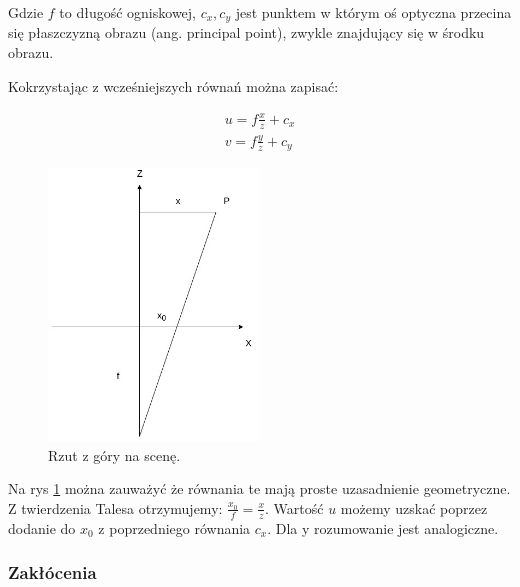 \documentclass{article}
\begin{document}
Gdzie $f$ to długość ogniskowej, $c_x, c_y$ jest punktem w którym oś optyczna przecina się płaszczyzną obrazu (ang. principal point), zwykle znajdujący się w środku obrazu.

Kokrzystając z wcześniejszych równań można zapisać:

\begin{align*}
	u = f \frac{x}{z} + c_x \\
	v = f \frac{y}{z} + c_y
\end{align*}

\begin{figure}
\centering
	\includegraphics[width=0.50\textwidth]{rzutowanie.jpg}\par\vspace{1cm}
\caption{Rzut z góry na scenę.}
	\label{fig:projection_up}
\end{figure}

Na rys \ref{fig:projection_up} można zauważyć że równania te mają proste uzasadnienie geometryczne. Z twierdzenia Talesa otrzymujemy: 
$\frac{x_0}{f} = \frac{x}{z}$. Wartość $u$ możemy uzskać poprzez dodanie do $x_0$ z poprzedniego równania $c_x$. Dla y rozumowanie jest analogiczne.

\subsubsection{Zakłócenia}
\end{document}
